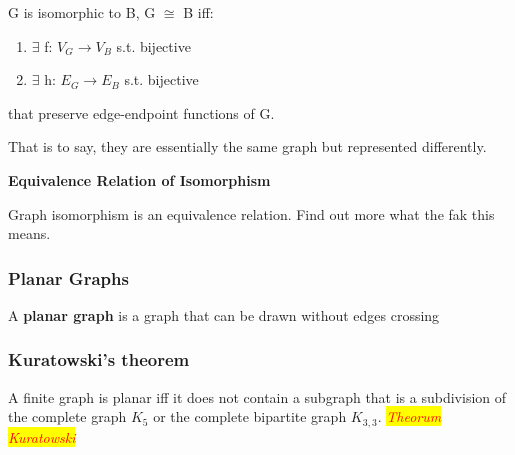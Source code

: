 \documentclass{article}
\newcommand{\theorum}[1]{\quad \quad \colorbox{yellow}{\textit{\textcolor{red}{Theorum #1}}}}
\newcommand{\sub}[1]{\vspace{10pt}\textbf{#1}}
\newcommand{\sbreak}{\vspace{10pt}}
\begin{document}
G is isomorphic to B, G $\cong$ B iff:
\begin{enumerate}
    \item $\exists$ f: $V_G \rightarrow V_B$ s.t. bijective
    \item $\exists$ h: $E_G \rightarrow E_B$ s.t. bijective
\end{enumerate}
that preserve edge-endpoint functions of G.

That is to say, they are essentially the same graph but represented differently.

\sub{Equivalence Relation of Isomorphism}

Graph isomorphism is an equivalence relation. Find out more what the fak this means.

\subsubsection{Planar Graphs}
A \textbf{planar graph} is a graph that can be drawn without edges crossing

\subsubsection{Kuratowski's theorem}
A finite graph is planar iff it does not contain a subgraph that is a subdivision of the complete graph $K_5$ or the complete bipartite graph $K_{3,3}$. \theorum{Kuratowski}

\sbreak

\end{document}
